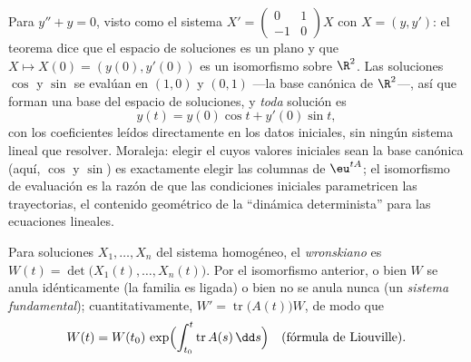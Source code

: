 \begin{example}\label{ex:b2:diffeq:evaliso}
Para $y'' + y = 0$, visto como el sistema $X' = \begin{pmatrix} 0 &
1\\ -1 & 0\end{pmatrix}X$ con $X = (y, y')$: el teorema dice que el
espacio de soluciones es un plano y que $X \mapsto X(0) = (y(0),
y'(0))$ es un isomorfismo sobre $\R^2$. Las soluciones $\cos$ y $\sin$
se evalúan en $(1, 0)$ y $(0, 1)$ ---la base canónica de $\R^2$---,
así que forman una base del espacio de soluciones, y \emph{toda}
solución es
\[
y(t) = y(0)\cos t + y'(0)\sin t ,
\]
con los coeficientes leídos directamente en los datos iniciales, sin
ningún sistema lineal que resolver. Moraleja: elegir el
 cuyos valores iniciales sean la base canónica
(aquí, $\cos$ y $\sin$) es exactamente elegir las columnas de
$\eu^{tA}$; el isomorfismo de evaluación es la razón de que las
condiciones iniciales parametricen las trayectorias, el contenido
geométrico de la ``dinámica determinista'' para las ecuaciones
lineales.
\end{example}

\begin{definition}[Wronskiano]\label{def:b2:diffeq:wronskian}
Para soluciones $X_1, \dots, X_n$ del sistema homogéneo, el
\emph{wronskiano} es $W(t) = \det\bigl(X_1(t),
\dots, X_n(t)\bigr)$. Por el isomorfismo anterior, o bien $W$ se
anula idénticamente (la familia es ligada) o bien no se anula nunca
(un \emph{sistema fundamental});
cuantitativamente, $W' = \operatorname{tr}\bigl(A(t)\bigr) W$, de
modo que
\[
W(t) = W(t_0)\,\exp\Bigl(\int_{t_0}^{t}
\operatorname{tr} A(s)\,\dd s\Bigr)
\quad \text{(fórmula de Liouville)}.
\]
\end{definition}

